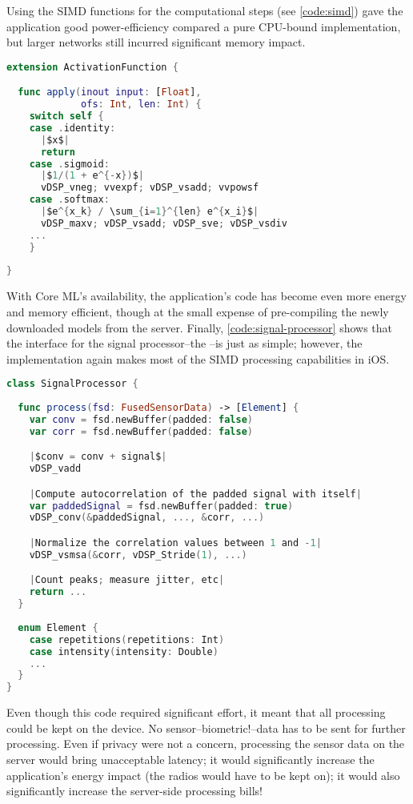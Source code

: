 Using the SIMD functions for the computational steps (see \autoref{code:simd}) gave the application good power-efficiency compared a pure CPU-bound implementation, but larger networks still incurred significant memory impact.

\begin{lstlisting}[caption={SIMD}, label={code:simd}, language=swift, escapechar=|]
extension ActivationFunction {

  func apply(inout input: [Float], 
             ofs: Int, len: Int) {
    switch self {
    case .identity: 
      |$x$|
      return
    case .sigmoid:
      |$1/(1 + e^{-x})$|
      vDSP_vneg; vvexpf; vDSP_vsadd; vvpowsf
    case .softmax:
      |$e^{x_k} / \sum_{i=1}^{len} e^{x_i}$|
      vDSP_maxv; vDSP_vsadd; vDSP_sve; vDSP_vsdiv
    ...
    }
    
}
\end{lstlisting}

With Core ML's availability, the application's code has become even more energy and memory efficient, though at the small expense of pre-compiling the newly downloaded models from the server. Finally, \autoref{code:signal-processor} shows that the interface for the signal processor--the --is just as simple; however, the implementation again makes most of the SIMD processing capabilities in iOS.

\begin{lstlisting}[caption={Signal processor}, label={code:signal-processor}, language=swift, escapechar=|]
class SignalProcessor {
  
  func process(fsd: FusedSensorData) -> [Element] { 
    var conv = fsd.newBuffer(padded: false)
    var corr = fsd.newBuffer(padded: false)

    |$conv = conv + signal$|
    vDSP_vadd

    |Compute autocorrelation of the padded signal with itself|
    var paddedSignal = fsd.newBuffer(padded: true)
    vDSP_conv(&paddedSignal, ..., &corr, ...)

    |Normalize the correlation values between 1 and -1|
    vDSP_vsmsa(&corr, vDSP_Stride(1), ...)

    |Count peaks; measure jitter, etc|
    return ...
  }
    
  enum Element {
    case repetitions(repetitions: Int)
    case intensity(intensity: Double)
    ...
  }
}
\end{lstlisting}

Even though this code required significant effort, it meant that all processing could be kept on the device. No sensor--biometric!--data has to be sent for further processing. Even if privacy were not a concern, processing the sensor data on the server would bring unacceptable latency; it would significantly increase the application's energy impact (the radios would have to be kept on); it would also significantly increase the server-side processing bills! 

